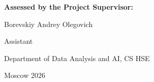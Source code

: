 \begin{titlepage}
\begin{flushleft}
\vspace{0.7cm}

\hspace{1cm}\textbf{Assessed by the Project Supervisor:}\par
\vspace{0.3cm}
\hspace{1cm}\begin{minipage}{0.92\textwidth}
Borevskiy Andrey Olegovich\par
Assistant\par
Department of Data Analysis and AI, CS HSE\par
\end{minipage}
\end{flushleft}

\vfill

{\large Moscow 2026\par}

\vspace{0.5cm}

\end{titlepage}
